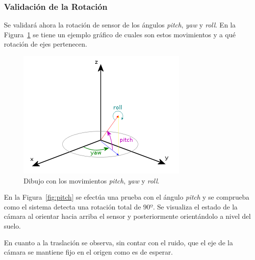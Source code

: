 \subsubsection{Validación de la Rotación}

Se validará ahora la rotación de sensor de los ángulos \textit{pitch}, \textit{yaw} y \textit{roll}. En la Figura~\ref{fig:p-y-r} se tiene un ejemplo gráfico de cuales son estos movimientos y a qué rotación de ejes pertenecen.

\begin{figure}[th]
\centering
\includegraphics[scale=0.9]{Figures/pitch_yaw_roll.png}
\decoRule
\caption[Explicación gráfica del movimiento \textit{pitch}, \textit{yaw} y \textit{roll}]{Dibujo con los movimientos \textit{pitch}, \textit{yaw} y \textit{roll}.}
\label{fig:p-y-r}
\end{figure}

En la Figura~\ref{fig:pitch} se efectúa una prueba con el ángulo \textit{pitch} y se comprueba como el sistema detecta una rotación total de $90º$. Se visualiza el estado de la cámara al orientar hacia arriba el sensor y posteriormente orientándolo a nivel del suelo. 

En cuanto a la traslación se observa, sin contar con el ruido, que el eje de la cámara se mantiene fijo en el origen como es de esperar.

